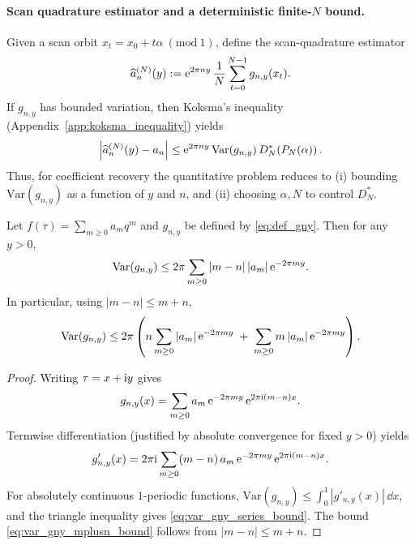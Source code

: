 \paragraph{Scan quadrature estimator and a deterministic finite-\texorpdfstring{$N$}{N} bound.}
Given a scan orbit $x_t=x_0+t\alpha\ (\mathrm{mod}\ 1)$, define the scan-quadrature estimator
\begin{equation}
\widehat a_n^{(N)}(y)
:=
\mathrm{e}^{2\pi n y}\,\frac{1}{N}\sum_{t=0}^{N-1} g_{n,y}(x_t).
\label{eq:scan_quadrature_estimator}
\end{equation}
If $g_{n,y}$ has bounded variation, then Koksma's inequality (Appendix~\ref{app:koksma_inequality}) yields
\begin{equation}
\left|\widehat a_n^{(N)}(y)-a_n\right|
\le
\mathrm{e}^{2\pi n y}\,\mathrm{Var}(g_{n,y})\,D_N^\ast\!\left(P_N(\alpha)\right).
\label{eq:coeff_recovery_koksma_bound}
\end{equation}
Thus, for coefficient recovery the quantitative problem reduces to (i) bounding $\mathrm{Var}(g_{n,y})$ as a function of $y$ and $n$, and (ii) choosing $\alpha,N$ to control $D_N^\ast$.

\begin{proposition}
\label{prop:var_gny_qexp}
Let $f(\tau)=\sum_{m\ge 0} a_m q^m$ and $g_{n,y}$ be defined by \eqref{eq:def_gny}. Then for any $y>0$,
\begin{equation}
\mathrm{Var}(g_{n,y})
\le
2\pi\sum_{m\ge 0} |m-n|\,|a_m|\,\mathrm{e}^{-2\pi m y}.
\label{eq:var_gny_series_bound}
\end{equation}
In particular, using $|m-n|\le m+n$,
\begin{equation}
\mathrm{Var}(g_{n,y})
\le
2\pi\left(
n\sum_{m\ge 0} |a_m|\,\mathrm{e}^{-2\pi m y}
\;+\;
\sum_{m\ge 0} m\,|a_m|\,\mathrm{e}^{-2\pi m y}
\right).
\label{eq:var_gny_mplusn_bound}
\end{equation}
\end{proposition}

\begin{proof}
Writing $\tau=x+\mathrm{i} y$ gives
\begin{equation}
g_{n,y}(x)=\sum_{m\ge 0} a_m\,\mathrm{e}^{-2\pi m y}\,\mathrm{e}^{2\pi\mathrm{i}(m-n)x}.
\end{equation}
Termwise differentiation (justified by absolute convergence for fixed $y>0$) yields
\begin{equation}
g'_{n,y}(x)=2\pi\mathrm{i}\sum_{m\ge 0} (m-n)\,a_m\,\mathrm{e}^{-2\pi m y}\,\mathrm{e}^{2\pi\mathrm{i}(m-n)x}.
\end{equation}
For absolutely continuous $1$-periodic functions, $\mathrm{Var}(g_{n,y})\le\int_0^1 |g'_{n,y}(x)|\,\dd x$, and the triangle inequality gives \eqref{eq:var_gny_series_bound}. The bound \eqref{eq:var_gny_mplusn_bound} follows from $|m-n|\le m+n$.
\end{proof}

